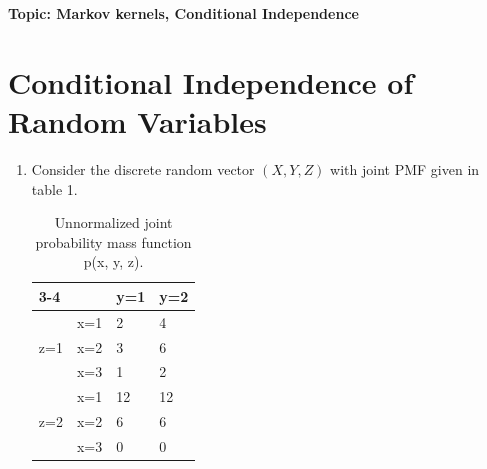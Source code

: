 

\flushleft\textbf{Topic: Markov kernels, Conditional Independence}
\section{Conditional Independence of Random Variables}
\begin{enumerate}
\item Consider the discrete random vector $(X, Y, Z)$ with joint PMF given in table 1.

\begin{table}[htb]
\centering
\begin{tabular}{llll}
\cline{3-4}
                                           & \multicolumn{1}{l|}{}    & \multicolumn{1}{l|}{y=1} & \multicolumn{1}{l|}{y=2} \\ \hline
\multicolumn{1}{|c|}{\multirow{3}{*}{z=1}} & \multicolumn{1}{l|}{x=1} & \multicolumn{1}{l|}{2}  & \multicolumn{1}{l|}{4}  \\ \cline{2-4} 
\multicolumn{1}{|c|}{}                     & \multicolumn{1}{l|}{x=2} & \multicolumn{1}{l|}{3}  & \multicolumn{1}{l|}{6}  \\ \cline{2-4} 
\multicolumn{1}{|c|}{}                     & \multicolumn{1}{l|}{x=3} & \multicolumn{1}{l|}{1}  & \multicolumn{1}{l|}{2}  \\ \hline
\multicolumn{1}{|l|}{\multirow{3}{*}{z=2}} & \multicolumn{1}{l|}{x=1} & \multicolumn{1}{l|}{12}  & \multicolumn{1}{l|}{12}  \\ \cline{2-4} 
\multicolumn{1}{|l|}{}                     & \multicolumn{1}{l|}{x=2} & \multicolumn{1}{l|}{6}  & \multicolumn{1}{l|}{6}    \\ \cline{2-4} 
\multicolumn{1}{|l|}{}                     & \multicolumn{1}{l|}{x=3} & \multicolumn{1}{l|}{0}    & \multicolumn{1}{l|}{0}  \\ \hline
\end{tabular}
\caption{Unnormalized joint probability mass function p(x, y, z).}
\end{table}\label{discrete-ci}


\end{enumerate}
